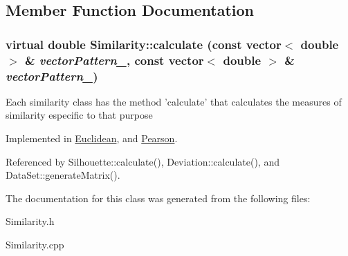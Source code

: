 \subsection{Member Function Documentation}
\hypertarget{classSimilarity_a3ff3d3622d8a45b15531bc143308b2ae}{
\subsubsection[{calculate}]{\setlength{\rightskip}{0pt plus 5cm}virtual double Similarity::calculate (const vector$<$ double $>$ \& {\em vectorPattern\_}, \/  const vector$<$ double $>$ \& {\em vectorPattern\_})}}
\label{classSimilarity_a3ff3d3622d8a45b15531bc143308b2ae}
Each similarity class has the method 'calculate' that calculates the measures of similarity especific to that purpose 

Implemented in \hyperlink{classEuclidean_a732c1c959cc6978d4e9050bc42fda186}{Euclidean}, and \hyperlink{classPearson_a71d128fcaecda770e5b36494a916252f}{Pearson}.

Referenced by Silhouette::calculate(), Deviation::calculate(), and DataSet::generateMatrix().

The documentation for this class was generated from the following files:\begin{DoxyCompactItemize}
\item 
Similarity.h\item 
Similarity.cpp\end{DoxyCompactItemize}
